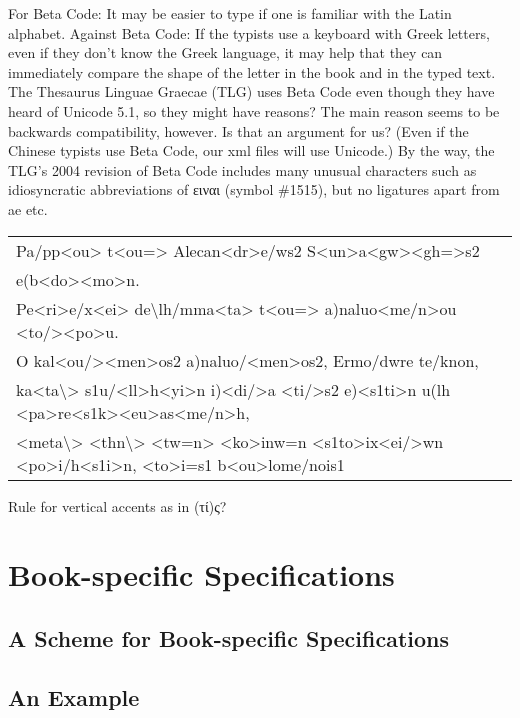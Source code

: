 For Beta Code: It may be easier to type if one is familiar with the Latin alphabet. Against Beta Code: If the typists use a keyboard with Greek letters, even if they don't know the Greek language, it may help that they can immediately compare the shape of the letter in the book and in the typed text. The Thesaurus Linguae Graecae (TLG) uses Beta Code even though they have heard of Unicode 5.1, so they might have reasons? The main reason seems to be backwards compatibility, however. Is that an argument for us? (Even if the Chinese typists use Beta Code, our xml files will use Unicode.) By the way, the TLG's 2004 revision of Beta Code includes many unusual characters such as idiosyncratic abbreviations of ειναι (symbol \#1515), but no ligatures apart from ae etc.

\begin{type}\small
\begin{tabular}{l}
Pa/pp<ou> t<ou=> Alecan<dr>e/ws2 S<un>a<gw><gh=>s2 \\
e(b<do><mo>n. \\
Pe<ri>e/x<ei> de\textbackslash lh/mma<ta> t<ou=> a)naluo<me/n>ou <to/><po>u. \\
O kal<ou/><men>os2 a)naluo/<men>os2, Ermo/dwre te/knon, \\
ka<ta\textbackslash> s1u/<ll>h<yi>n i)<di/>a <ti/>s2 e)<s1ti>n u(lh <pa>re<s1k><eu>as<me/n>h, \\
<meta\textbackslash> <thn\textbackslash> <tw=n> <ko>inw=n <s1to>ix<ei/>wn <po>i/h<s1i>n, <to>i=s1 b<ou>lome/nois1 \\
\end{tabular}
\end{type}



Rule for vertical accents as in (τί)ς? 


\section{Book-specific Specifications}

\subsection{A Scheme for Book-specific Specifications}

\subsection{An Example}

